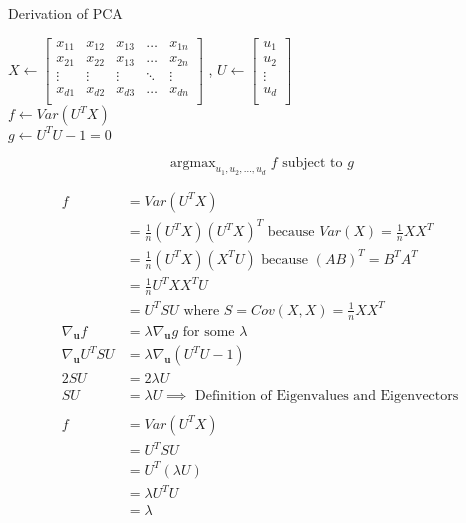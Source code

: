\documentclass{article}
\begin{document}
\begin{algorithm}
  \caption{Derivation of PCA}
  \begin{algorithmic}
    \State $X \gets
    \begin{bmatrix}
      x_{11} & x_{12} & x_{13} & \dots & x_{1n} \\
      x_{21} & x_{22} & x_{13} & \dots & x_{2n} \\
      \vdots & \vdots & \vdots & \ddots & \vdots \\
      x_{d1} & x_{d2} & x_{d3} & \dots & x_{dn} \\
    \end{bmatrix}$
    , $U
    \gets \begin{bmatrix}
      u_1 \\
      u_2 \\
      \vdots \\
      u_d \\
    \end{bmatrix}$ 
    \State \\
    \State $f \gets Var(U^T X)$ 
    \State \\
    \State $g \gets U^{T}U - 1 = 0$ 
    
    $$\operatorname{argmax}_{u_1, u_2, \dots, u_d} f \text{ subject to } g$$

    $$
    \begin{aligned}
      f &= Var(U^T X) \\
      &= \frac{1}{n}(U^T X)(U^T X)^T \text{ because } Var(X) = \frac{1}{n} XX^T \\
      &= \frac{1}{n}(U^T X)(X^T U) \text{ because } (AB)^T = B^T A^T \\
      &= \frac{1}{n}U^T X X^T U \\
      &= U^{T}SU \text{ where } S = Cov(X,X) = \frac{1}{n}X X^T \\
      \nabla_\mathbf{u} f &= \lambda \nabla_\mathbf{u} g \text{ for some } \lambda \\
      \nabla_\mathbf{u} U^{T}SU &= \lambda \nabla_\mathbf{u} (U^{T}U - 1) \\
      2SU &= 2\lambda U \\
      SU &= \lambda U \implies \text{ Definition of Eigenvalues and Eigenvectors}\\
      \\
      f &= Var(U^T X) \\
      &= U^{T}SU \\
      &= U^{T} (\lambda U) \\
      &= \lambda U^T U \\ 
      &= \lambda
    \end{aligned}
    $$
  \end{algorithmic}
  \end{algorithm}
\end{document}
